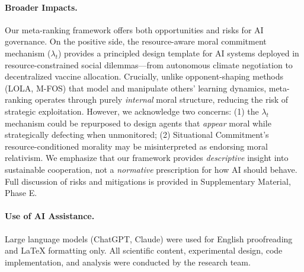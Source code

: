 \documentclass{article}
\begin{document}
\paragraph{Broader Impacts.}
Our meta-ranking framework offers both opportunities and risks for AI governance. On the positive side, the resource-aware moral commitment mechanism ($\lambda_t$) provides a principled design template for AI systems deployed in resource-constrained social dilemmas---from autonomous climate negotiation to decentralized vaccine allocation. Crucially, unlike opponent-shaping methods (LOLA, M-FOS) that model and manipulate others' learning dynamics, meta-ranking operates through purely \textit{internal} moral structure, reducing the risk of strategic exploitation.
However, we acknowledge two concerns: (1) the $\lambda_t$ mechanism could be repurposed to design agents that \textit{appear} moral while strategically defecting when unmonitored; (2) Situational Commitment's resource-conditioned morality may be misinterpreted as endorsing moral relativism. We emphasize that our framework provides \textit{descriptive} insight into sustainable cooperation, not a \textit{normative} prescription for how AI should behave. Full discussion of risks and mitigations is provided in Supplementary Material, Phase E.

\paragraph{Use of AI Assistance.} Large language models (ChatGPT, Claude) were used for English proofreading and LaTeX formatting only. All scientific content, experimental design, code implementation, and analysis were conducted by the research team.





\end{document}
